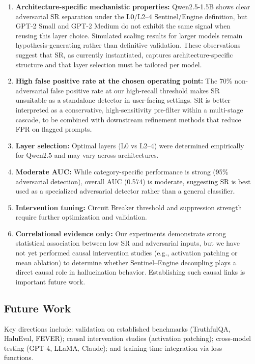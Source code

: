 \begin{enumerate}
	        \item \textbf{Architecture-specific mechanistic properties:} Qwen2.5-1.5B shows clear adversarial SR separation under the L0/L2--4 Sentinel/Engine definition, but GPT-2 Small and GPT-2 Medium do not exhibit the same signal when reusing this layer choice. Simulated scaling results for larger models remain hypothesis-generating rather than definitive validation. These observations suggest that SR, as currently instantiated, captures architecture-specific structure and that layer selection must be tailored per model.
	    \item \textbf{High false positive rate at the chosen operating point:} The 70\% non-adversarial false positive rate at our high-recall threshold makes SR unsuitable as a standalone detector in user-facing settings. SR is better interpreted as a conservative, high-sensitivity pre-filter within a multi-stage cascade, to be combined with downstream refinement methods that reduce FPR on flagged prompts.
	    \item \textbf{Layer selection:} Optimal layers (L0 vs L2--4) were determined empirically for Qwen2.5 and may vary across architectures.
	    \item \textbf{Moderate AUC:} While category-specific performance is strong (95\% adversarial detection), overall AUC (0.574) is moderate, suggesting SR is best used as a specialized adversarial detector rather than a general classifier.
	    \item \textbf{Intervention tuning:} Circuit Breaker threshold and suppression strength require further optimization and validation.
	    \item \textbf{Correlational evidence only:} Our experiments demonstrate strong statistical association between low SR and adversarial inputs, but we have not yet performed causal intervention studies (e.g., activation patching or mean ablation) to determine whether Sentinel--Engine decoupling plays a direct causal role in hallucination behavior. Establishing such causal links is important future work.
\end{enumerate}

\subsection{Future Work}

Key directions include: validation on established benchmarks (TruthfulQA, HaluEval, FEVER); causal intervention studies (activation patching); cross-model testing (GPT-4, LLaMA, Claude); and training-time integration via loss functions.

